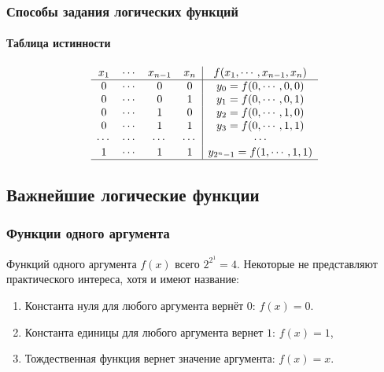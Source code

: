 \begin{frame}
    \frametitle{Способы задания логических функций}
    \framesubtitle{Таблица истинности}

    \[
        \begin{array}{cccc|c}
            x_1 &\cdots&x_{n-1} &x_n&f(x_1,\cdots,x_{n-1},x_n)\\
            \hline
            0   &\cdots&0       &0  &y_0=f(0,\cdots,0,0)\\
            0   &\cdots&0       &1  &y_1=f(0,\cdots,0,1)\\
            0   &\cdots&1       &0  &y_2=f(0,\cdots,1,0)\\
            0   &\cdots&1       &1  &y_3=f(0,\cdots,1,1)\\
            \cdots   &\cdots&\cdots       &\cdots  &\cdots\\
            1   &\cdots&1       &1  &y_{2^n-1}=f(1,\cdots,1,1)\\
            \hline
        \end{array}
    \]
    
\end{frame}


\subsection{Важнейшие логические функции}

\begin{frame}
    \frametitle{Функции одного аргумента}
    
    Функций одного аргумента $f(x)$ всего $2^{2^{1}}=4$. Некоторые не представляют практического интереса, хотя и имеют название:
    \begin{enumerate}
        \item \alert{Константа нуля} для любого аргумента вернёт $0$: $f(x)=0$.
        \item \alert{Константа единицы} для любого аргумента вернет $1$: $f(x)=1$, 
        \item \alert{Тождественная функция} вернет значение аргумента: $f(x)=x$.
    \end{enumerate}
\end{frame}

